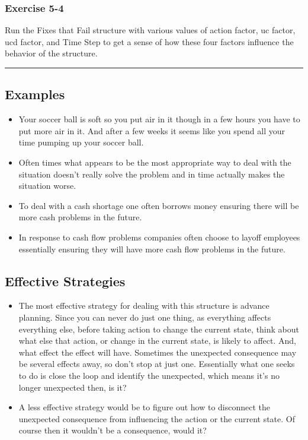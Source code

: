 \documentclass[]{memoir}
\begin{document}
\subsubsection{Exercise 5-4}

Run the Fixes that Fail structure with various values of action factor,
uc factor, ucd factor, and Time Step to get a sense of how these four
factors influence the behavior of the structure.

\begin{center}\rule{3in}{0.4pt}\end{center}

\subsection{Examples}

\begin{itemize}
\itemsep1pt\parskip0pt
\item
  Your soccer ball is soft so you put air in it though in a few hours
  you have to put more air in it. And after a few weeks it seems like
  you spend all your time pumping up your soccer ball.
\item
  Often times what appears to be the most appropriate way to deal with
  the situation doesn't really solve the problem and in time actually
  makes the situation worse.
\item
  To deal with a cash shortage one often borrows money ensuring there
  will be more cash problems in the future.
\item
  In response to cash flow problems companies often choose to layoff
  employees essentially ensuring they will have more cash flow problems
  in the future.
\end{itemize}

\subsection{Effective Strategies}

\begin{itemize}
\itemsep1pt\parskip0pt
\item
  The most effective strategy for dealing with this structure is advance
  planning. Since you can never do just one thing, as everything affects
  everything else, before taking action to change the current state,
  think about what else that action, or change in the current state, is
  likely to affect. And, what effect the effect will have. Sometimes the
  unexpected consequence may be several effects away, so don't stop at
  just one. Essentially what one seeks to do is close the loop and
  identify the unexpected, which means it's no longer unexpected then,
  is it?
\item
  A less effective strategy would be to figure out how to disconnect the
  unexpected consequence from influencing the action or the current
  state. Of course then it wouldn't be a consequence, would it?
\end{itemize}
\end{document}

